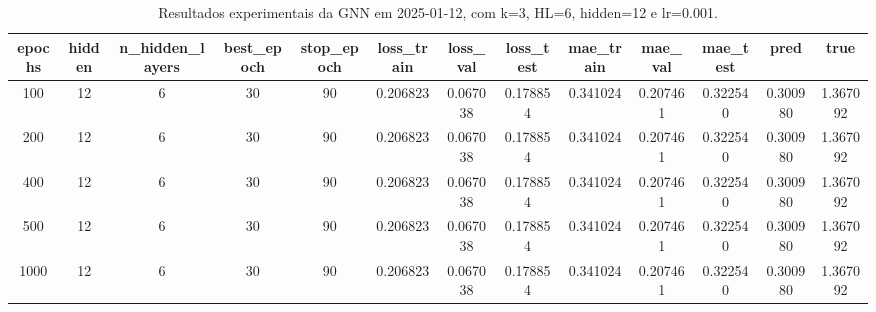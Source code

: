 \begin{table}[h]
\centering
\caption{Resultados experimentais da GNN em 2025-01-12, com k=3, HL=6, hidden=12 e lr=0.001.}
\label{tab:gnn_results_k3_hl6_h12_d20250112}
\begin{tabular}{ccccccccccccc}
\toprule
epochs & hidden & n\_hidden\_layers & best\_epoch & stop\_epoch & loss\_train & loss\_val & loss\_test & mae\_train & mae\_val & mae\_test & pred & true \\
\midrule
100 & 12 & 6 & 30 & 90 & 0.206823 & 0.067038 & 0.178854 & 0.341024 & 0.207461 & 0.322540 & 0.300980 & 1.367092 \\
200 & 12 & 6 & 30 & 90 & 0.206823 & 0.067038 & 0.178854 & 0.341024 & 0.207461 & 0.322540 & 0.300980 & 1.367092 \\
400 & 12 & 6 & 30 & 90 & 0.206823 & 0.067038 & 0.178854 & 0.341024 & 0.207461 & 0.322540 & 0.300980 & 1.367092 \\
500 & 12 & 6 & 30 & 90 & 0.206823 & 0.067038 & 0.178854 & 0.341024 & 0.207461 & 0.322540 & 0.300980 & 1.367092 \\
1000 & 12 & 6 & 30 & 90 & 0.206823 & 0.067038 & 0.178854 & 0.341024 & 0.207461 & 0.322540 & 0.300980 & 1.367092 \\
\bottomrule
\end{tabular}
\end{table}
